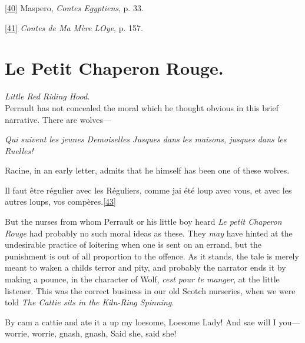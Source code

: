 \documentclass[14pt,a4paper]{memoir}
\begin{document}
\protect\hypertarget{4533318093929944247_33931-h-0.htm.xhtmlux5cux23Footnote_40}{}{}\protect\hyperlink{4533318093929944247_33931-h-0.htm.xhtmlux5cux23FNanchor_40}{{{[}40{]}}}
Maspero, \emph{Contes Egyptiens}, p. 33.

\protect\hypertarget{4533318093929944247_33931-h-0.htm.xhtmlux5cux23Footnote_41}{}{}\protect\hyperlink{4533318093929944247_33931-h-0.htm.xhtmlux5cux23FNanchor_41}{{{[}41{]}}}
\emph{Contes de Ma Mère L\textquotesingle Oye}, p. 157.

\section{Le Petit Chaperon Rouge.}

\emph{Little Red Riding Hood.} \\

Perrault has not concealed the moral which he thought obvious in this
brief narrative. There are wolves---

\emph{{\textquotesingle Qui suivent les jeunes Demoiselles} {Jusques
dans les maisons, jusques dans les Ruelles!\textquotesingle{}}}

Racine, in an early letter, admits that he himself has been one of these
wolves.

\textquotesingle Il faut être régulier avec les Réguliers, comme
j\textquotesingle ai été loup avec vous, et avec les autres loups, vos
compères.\protect\hypertarget{4533318093929944247_33931-h-0.htm.xhtmlux5cux23FNanchor_43}{}{}\protect\hyperlink{4533318093929944247_33931-h-0.htm.xhtmlux5cux23Footnote_43}{{[}43{]}}\textquotesingle{}

But the nurses from whom Perrault or his little boy heard \emph{Le petit
Chaperon Rouge} had probably no such moral ideas as these. They
\emph{may} have hinted at the undesirable practice of loitering when one
is sent on an errand, but the punishment is out of all proportion to the
offence. As it stands, the tale is merely meant to waken a
child\textquotesingle s terror and pity, and probably the narrator ends
it by making a pounce, in the character of Wolf,
\emph{c\textquotesingle est pour te manger}, at the little listener.
This was the correct \textquotesingle business\textquotesingle{} in our
old Scotch nurseries, when we were told \emph{The Cattie sits in the
Kiln-Ring Spinning}.

{\textquotesingle By cam\textquotesingle{} a cattie and ate it
a\textquotesingle{} up my loesome,} {Loesome Lady!} {And sae will I
you---worrie, worrie, gnash, gnash,} {Said she, said
she!\textquotesingle{}}
\end{document}
